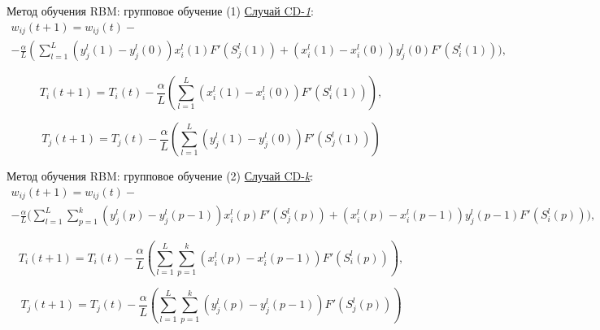 \documentclass[10pt]{beamer}
\begin{document}
        \begin{frame}{Метод обучения RBM: групповое обучение (1)}
            \underline{Случай CD-\textit{1}}:
            \begin{multline*}
                w_{ij}(t+1)=w_{ij}(t)-\\-\frac{\alpha}{L}\left(\sum_{l=1}^L (y_j^l(1)-y_j^l(0))x_i^l(1)F'(S_j^l(1))+(x_i^l(1)-x_i^l(0))y_j^l(0)F'(S_i^l(1))\Bigg)\right.,
            \end{multline*}

            \begin{equation*}
                T_i(t+1)=T_i(t)-\frac{\alpha}{L}\left(\sum_{l=1}^L (x_i^l(1)-x_i^l(0))F'(S_i^l(1))\right),
            \end{equation*}

            \begin{equation*}
                T_j(t+1)=T_j(t)-\frac{\alpha}{L}\left(\sum_{l=1}^L (y_j^l(1)-y_j^l(0))F'(S_j^l(1))\right)
            \end{equation*}
        \end{frame}

        \begin{frame}{Метод обучения RBM: групповое обучение (2)}
            \underline{Случай CD-\textit{k}}:
            \begin{multline*}
                w_{ij}(t+1)=w_{ij}(t)-\\-\frac{\alpha}{L}\Bigg(\sum_{l=1}^L\sum_{p=1}^k (y_j^l(p)-y_j^l(p-1))x_i^l(p)F'(S_j^l(p))+(x_i^l(p)-x_i^l(p-1))y_j^l(p-1)F'(S_i^l(p))\Bigg),
            \end{multline*}

            \begin{equation*}
                T_{i}(t+1)=T_{i}(t)-\frac{\alpha}{L}\left(\sum_{l=1}^L\sum_{p=1}^k (x_i^l(p)-x_i^l(p-1))F'(S_i^l(p))\right),
            \end{equation*}

            \begin{equation*}
                T_{j}(t+1)=T_{j}(t)-\frac{\alpha}{L}\left(\sum_{l=1}^L\sum_{p=1}^k (y_j^l(p)-y_j^l(p-1))F'(S_j^l(p))\right)
            \end{equation*}
        \end{frame}
\end{document}
